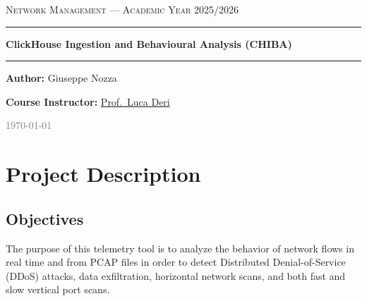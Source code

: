 \documentclass[11pt,a4paper]{article}
\begin{document}
\begin{titlepage}
    \centering
    \vspace*{1.5cm}

    {\scshape\Large\sffamily\textcolor{chibateal}{Network Management --- Academic Year 2025/2026}\par}
    \vspace{0.8cm}
    {\color{chibablue}\rule{\textwidth}{1.5pt}\par}
    \vspace{0.6cm}
    {\huge\bfseries\sffamily\textcolor{chibadark}{ClickHouse Ingestion and Behavioural Analysis (CHIBA)}\par}
    \vspace{0.6cm}
    {\color{chibablue}\rule{\textwidth}{1.5pt}\par}

    \vspace{2cm}

    {\large\sffamily\textbf{Author:} Giuseppe Nozza\par}
    \vspace{0.25cm}
    {\normalsize\sffamily\textbf{Course Instructor:} \href{https://luca.ntop.org/}{Prof.\ Luca Deri}\par}
    \vspace{0.3cm}
    {\normalsize\sffamily\textcolor{gray}{\today}\par}

    \vfill
\end{titlepage}

\tableofcontents
\newpage
{}

\section{Project Description}

\subsection{Objectives}
The purpose of this telemetry tool is to analyze the behavior of network flows in real time and from PCAP files in order to detect Distributed Denial-of-Service (DDoS) attacks, data exfiltration, horizontal network scans, and both fast and slow vertical port scans.
\end{document}
